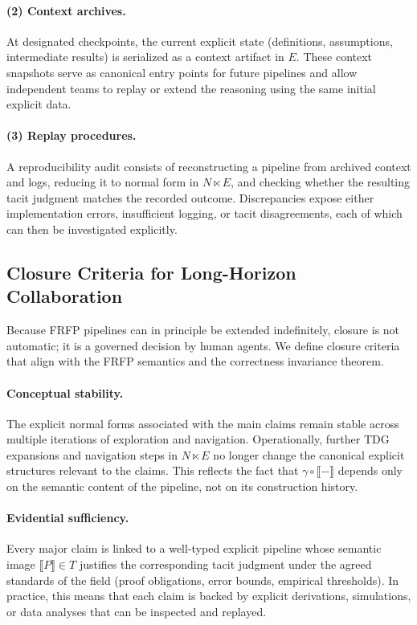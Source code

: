 \paragraph{(2) Context archives.}
At designated checkpoints, the current explicit state (definitions, assumptions,
intermediate results) is serialized as a context artifact in \(E\). These context
snapshots serve as canonical entry points for future pipelines and allow independent
teams to replay or extend the reasoning using the same initial explicit data.

\paragraph{(3) Replay procedures.}
A reproducibility audit consists of reconstructing a pipeline from archived context
and logs, reducing it to normal form in \(N \ltimes E\), and checking whether the
resulting tacit judgment matches the recorded outcome. Discrepancies expose either
implementation errors, insufficient logging, or tacit disagreements, each of which
can then be investigated explicitly.

\subsection{Closure Criteria for Long-Horizon Collaboration}

Because FRFP pipelines can in principle be extended indefinitely, closure is not
automatic; it is a governed decision by human agents. We define closure criteria
that align with the FRFP semantics and the correctness invariance theorem.

\paragraph{Conceptual stability.}
The explicit normal forms associated with the main claims remain stable across
multiple iterations of exploration and navigation. Operationally, further TDG
expansions and navigation steps in \(N \ltimes E\) no longer change the canonical
explicit structures relevant to the claims. This reflects the fact that
\(\gamma \circ \llbracket - \rrbracket\) depends only on the semantic content of the
pipeline, not on its construction history.

\paragraph{Evidential sufficiency.}
Every major claim is linked to a well-typed explicit pipeline whose semantic image
\(\llbracket P \rrbracket \in T\) justifies the corresponding tacit judgment under
the agreed standards of the field (proof obligations, error bounds, empirical
thresholds). In practice, this means that each claim is backed by explicit
derivations, simulations, or data analyses that can be inspected and replayed.

